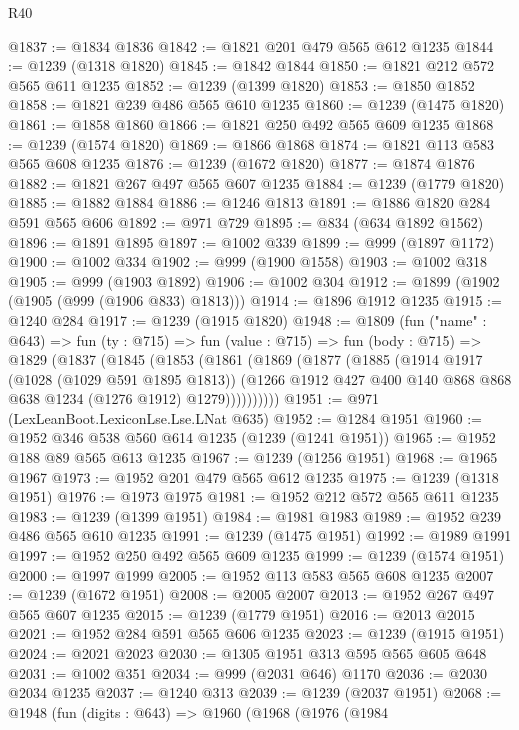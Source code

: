 \begin{lexlean}{R40}
\begin{coremodule}
@1837 := @1834 @1836
@1842 := @1821 @201 @479 @565 @612 @1235
@1844 := @1239 (@1318 @1820)
@1845 := @1842 @1844
@1850 := @1821 @212 @572 @565 @611 @1235
@1852 := @1239 (@1399 @1820)
@1853 := @1850 @1852
@1858 := @1821 @239 @486 @565 @610 @1235
@1860 := @1239 (@1475 @1820)
@1861 := @1858 @1860
@1866 := @1821 @250 @492 @565 @609 @1235
@1868 := @1239 (@1574 @1820)
@1869 := @1866 @1868
@1874 := @1821 @113 @583 @565 @608 @1235
@1876 := @1239 (@1672 @1820)
@1877 := @1874 @1876
@1882 := @1821 @267 @497 @565 @607 @1235
@1884 := @1239 (@1779 @1820)
@1885 := @1882 @1884
@1886 := @1246 @1813
@1891 := @1886 @1820 @284 @591 @565 @606
@1892 := @971 @729
@1895 := @834 (@634 @1892 @1562)
@1896 := @1891 @1895
@1897 := @1002 @339
@1899 := @999 (@1897 @1172)
@1900 := @1002 @334
@1902 := @999 (@1900 @1558)
@1903 := @1002 @318
@1905 := @999 (@1903 @1892)
@1906 := @1002 @304
@1912 := @1899 (@1902 (@1905 (@999 (@1906 @833) @1813)))
@1914 := @1896 @1912 @1235
@1915 := @1240 @284
@1917 := @1239 (@1915 @1820)
@1948 := @1809
    (fun ("name" : @643) =>
    fun (ty : @715) =>
    fun (value : @715) =>
    fun (body : @715) =>
    @1829
      (@1837
        (@1845
          (@1853
            (@1861
              (@1869
                (@1877
                  (@1885
                    (@1914
                      @1917
                      (@1028 (@1029 @591 @1895 @1813))
                      (@1266 @1912 @427 @400 @140 @868 @868 @638 @1234 (@1276 @1912) @1279))))))))))
@1951 := @971 (LexLeanBoot.LexiconLse.Lse.LNat @635)
@1952 := @1284 @1951
@1960 := @1952 @346 @538 @560 @614 @1235 (@1239 (@1241 @1951))
@1965 := @1952 @188 @89 @565 @613 @1235
@1967 := @1239 (@1256 @1951)
@1968 := @1965 @1967
@1973 := @1952 @201 @479 @565 @612 @1235
@1975 := @1239 (@1318 @1951)
@1976 := @1973 @1975
@1981 := @1952 @212 @572 @565 @611 @1235
@1983 := @1239 (@1399 @1951)
@1984 := @1981 @1983
@1989 := @1952 @239 @486 @565 @610 @1235
@1991 := @1239 (@1475 @1951)
@1992 := @1989 @1991
@1997 := @1952 @250 @492 @565 @609 @1235
@1999 := @1239 (@1574 @1951)
@2000 := @1997 @1999
@2005 := @1952 @113 @583 @565 @608 @1235
@2007 := @1239 (@1672 @1951)
@2008 := @2005 @2007
@2013 := @1952 @267 @497 @565 @607 @1235
@2015 := @1239 (@1779 @1951)
@2016 := @2013 @2015
@2021 := @1952 @284 @591 @565 @606 @1235
@2023 := @1239 (@1915 @1951)
@2024 := @2021 @2023
@2030 := @1305 @1951 @313 @595 @565 @605 @648
@2031 := @1002 @351
@2034 := @999 (@2031 @646) @1170
@2036 := @2030 @2034 @1235
@2037 := @1240 @313
@2039 := @1239 (@2037 @1951)
@2068 := @1948
    (fun (digits : @643) =>
    @1960
      (@1968
        (@1976
          (@1984

\end{coremodule}
\end{lexlean}

